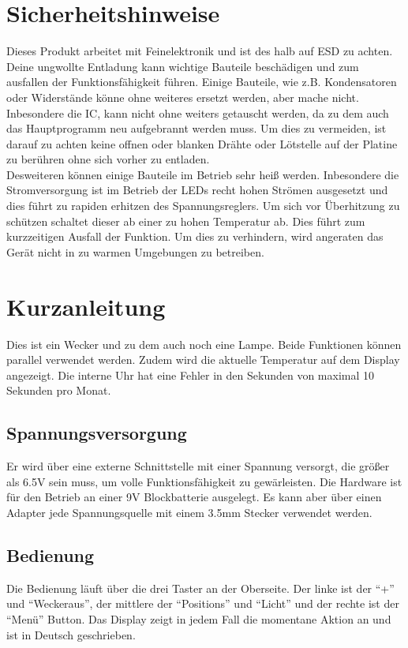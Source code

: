 \documentclass[12pt,a4paper,titlepage,headinclude]{scrartcl}
\numberwithin{equation}{subsection}
\begin{document}
\section{Sicherheitshinweise}
\label{sec:sicherheitshinweise}
Dieses Produkt arbeitet mit Feinelektronik und ist des halb auf ESD zu achten.
Deine ungwollte Entladung kann wichtige Bauteile beschädigen und zum ausfallen der Funktionsfähigkeit führen.
Einige Bauteile, wie z.B. Kondensatoren oder Widerstände könne ohne weiteres ersetzt werden, aber mache nicht.
Inbesondere die IC, kann nicht ohne weiters getauscht werden, da zu dem auch das Hauptprogramm neu aufgebrannt werden muss.
Um dies zu vermeiden, ist darauf zu achten keine offnen oder blanken Drähte oder Lötstelle auf der Platine zu berühren ohne sich vorher zu entladen.\\
Desweiteren können einige Bauteile im Betrieb sehr heiß werden.
Inbesondere die Stromversorgung ist im Betrieb der LEDs recht hohen Strömen ausgesetzt und dies führt zu rapiden erhitzen des Spannungsreglers.
Um sich vor Überhitzung zu schützen schaltet dieser ab einer zu hohen Temperatur ab.
Dies führt zum kurzzeitigen Ausfall der Funktion.
Um dies zu verhindern, wird angeraten das Gerät nicht in zu warmen Umgebungen zu betreiben.


\section{Kurzanleitung}
\label{sec:kurzanleitung}
Dies ist ein Wecker und zu dem auch noch eine Lampe.
Beide Funktionen können parallel verwendet werden.
Zudem wird die aktuelle Temperatur auf dem Display angezeigt.
Die interne Uhr hat eine Fehler in den Sekunden von maximal 10 Sekunden pro Monat.

\subsection{Spannungsversorgung}
Er wird über eine externe Schnittstelle mit einer Spannung versorgt, die größer als 6.5\si{\volt} sein muss, um volle Funktionsfähigkeit zu gewärleisten.
Die Hardware ist für den Betrieb an einer 9\si{\volt} Blockbatterie ausgelegt.
Es kann aber über einen Adapter jede Spannungsquelle mit einem 3.5\si{\milli\meter} Stecker verwendet werden.

\subsection{Bedienung}
Die Bedienung läuft über die drei Taster an der Oberseite.
Der linke ist der "`+"' und "`Weckeraus"', der mittlere der "`Positions"' und "`Licht"' und der rechte ist der "`Menü"' Button.
Das Display zeigt in jedem Fall die momentane Aktion an und ist in Deutsch geschrieben.
\end{document}
